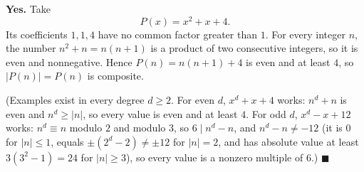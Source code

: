\textbf{Yes.} Take
\[P(x)=x^2+x+4.\]
Its coefficients $1,1,4$ have no common factor greater than $1$. For every integer $n$, the number $n^2+n=n(n+1)$ is a product of two consecutive integers, so it is even and nonnegative. Hence $P(n)=n(n+1)+4$ is even and at least $4$, so $|P(n)|=P(n)$ is composite.

(Examples exist in every degree $d\ge2$. For even $d$, $x^d+x+4$ works: $n^d+n$ is even and $n^d\ge|n|$, so every value is even and at least $4$. For odd $d$, $x^d-x+12$ works: $n^d\equiv n$ modulo $2$ and modulo $3$, so $6\mid n^d-n$, and $n^d-n\ne-12$ (it is $0$ for $|n|\le1$, equals $\pm\left(2^d-2\right)\ne\pm12$ for $|n|=2$, and has absolute value at least $3\left(3^2-1\right)=24$ for $|n|\ge3$), so every value is a nonzero multiple of $6$.) $\blacksquare$

